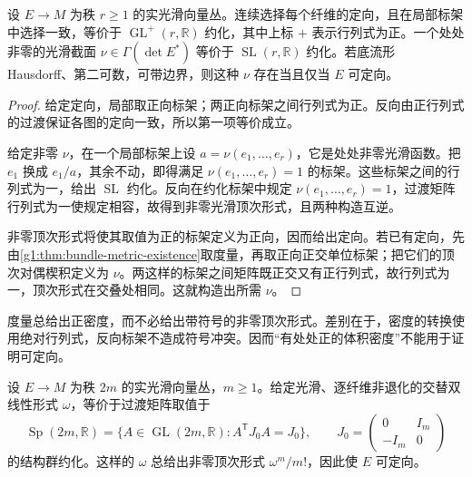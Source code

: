 \begin{proposition}
	\label{g1:prop:orientation-volume-reductions}
	设 \(E\to M\) 为秩 \(r\geq1\) 的实光滑向量丛。连续选择每个纤维的定向，且在局部标架中选择一致，等价于 \(\operatorname{GL}^+(r,\mathbb R)\) 约化，其中上标 \(+\) 表示行列式为正。一个处处非零的光滑截面 \(\nu\in\Gamma(\det E^*)\) 等价于 \(\operatorname{SL}(r,\mathbb R)\) 约化。若底流形 Hausdorff、第二可数，可带边界，则这种 \(\nu\) 存在当且仅当 \(E\) 可定向。
\end{proposition}

\begin{proof}
	给定定向，局部取正向标架；两正向标架之间行列式为正。反向由正行列式的过渡保证各图的定向一致，所以第一项等价成立。

	给定非零 \(\nu\)，在一个局部标架上设 \(a=\nu(e_1,\ldots,e_r)\)，它是处处非零光滑函数。把 \(e_1\) 换成 \(e_1/a\)，其余不动，即得满足 \(\nu(e_1,\ldots,e_r)=1\) 的标架。这些标架之间的行列式为一，给出 \(\operatorname{SL}\) 约化。反向在约化标架中规定 \(\nu(e_1,\ldots,e_r)=1\)，过渡矩阵行列式为一使规定相容，故得到非零光滑顶次形式，且两种构造互逆。

	非零顶次形式将使其取值为正的标架定义为正向，因而给出定向。若已有定向，先由\cref{g1:thm:bundle-metric-existence}取度量，再取正向正交单位标架；把它们的顶次对偶楔积定义为 \(\nu\)。两这样的标架之间矩阵既正交又有正行列式，故行列式为一，顶次形式在交叠处相同。这就构造出所需 \(\nu\)。
\end{proof}

度量总给出正密度，而不必给出带符号的非零顶次形式。差别在于，密度的转换使用绝对行列式，反向标架不造成符号冲突。因而“有处处正的体积密度”不能用于证明可定向。

\begin{proposition}
	\label{g1:prop:symplectic-frame-reduction}
	设 \(E\to M\) 为秩 \(2m\) 的实光滑向量丛，\(m\geq1\)。给定光滑、逐纤维非退化的交替双线性形式 \(\omega\)，等价于过渡矩阵取值于
	\[
		\operatorname{Sp}(2m,\mathbb R)
		=\{A\in\operatorname{GL}(2m,\mathbb R):A^{\mathsf T}J_0A=J_0\},
		\qquad J_0=\begin{pmatrix}0&I_m\\-I_m&0\end{pmatrix}
	\]
	的结构群约化。这样的 \(\omega\) 总给出非零顶次形式 \(\omega^m/m!\)，因此使 \(E\) 可定向。
\end{proposition}

